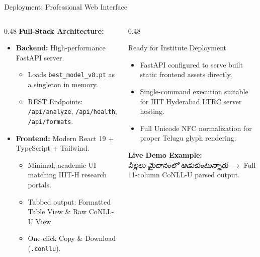 \documentclass[aspectratio=169, 10pt]{beamer}
\begin{document}
\begin{frame}{Deployment: Professional Web Interface}
  \begin{columns}[T]
    \begin{column}{0.48\textwidth}
      \textbf{Full-Stack Architecture:}
      \begin{itemize}
        \item \textbf{Backend:} High-performance FastAPI server.
        \begin{itemize}
          \item Loads \texttt{best\_model\_v8.pt} as a singleton in memory.
          \item REST Endpoints: \texttt{/api/analyze}, \texttt{/api/health}, \texttt{/api/formats}.
        \end{itemize}
        \item \textbf{Frontend:} Modern React 19 + TypeScript + Tailwind.
        \begin{itemize}
          \item Minimal, academic UI matching IIIT-H research portals.
          \item Tabbed output: Formatted Table View \& Raw CoNLL-U View.
          \item One-click Copy \& Download (\texttt{.conllu}).
        \end{itemize}
      \end{itemize}
    \end{column}

    \begin{column}{0.48\textwidth}
      \begin{exampleblock}{Ready for Institute Deployment}
        \begin{itemize}
          \item FastAPI configured to serve built static frontend assets directly.
          \item Single-command execution suitable for IIIT Hyderabad LTRC server hosting.
          \item Full Unicode NFC normalization for proper Telugu glyph rendering.
        \end{itemize}
      \end{exampleblock}
      \vspace{0.2cm}
      \centering
      \small \textbf{Live Demo Example:} \\
      \textit{పిల్లలు మైదానంలో ఆడుకుంటున్నారు} $\rightarrow$ Full 11-column CoNLL-U parsed output.
    \end{column}
  \end{columns}
\end{frame}
\end{document}

